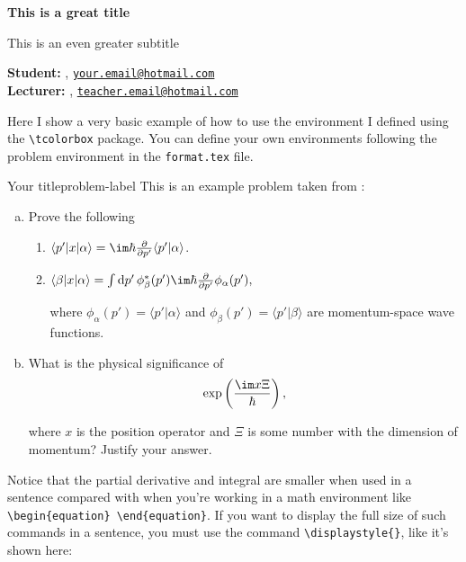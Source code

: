 \documentclass[letterpaper, 11pt]{extarticle}
\begin{document}
\begin{Large}
    \textsf{\textbf{This is a great title}}
    
    This is an even greater subtitle
\end{Large}

\vspace{1ex}

\textsf{\textbf{Student:}} , \href{mailto:your.email@hotmail.com}{\texttt{your.email@hotmail.com}}\\
\textsf{\textbf{Lecturer:}} , \href{mailto:teacher.email@hotmail.com}{\texttt{teacher.email@hotmail.com}}


\vspace{2ex}

Here I show a very basic example of how to use the  environment I defined using the \verb|\tcolorbox| package. You can define your own environments following the problem environment in the \texttt{format.tex} file.

\begin{problem}{Your title}{problem-label}
This is an example problem taken from \cite{Sakurai2020}:

\begin{enumerate}[(a)]
    \item Prove the following
    \begin{enumerate}[label = (\roman*)]
        \item $\langle p' | x | \alpha \rangle = \im \hbar \pdv{}{p'} \langle p' | \alpha \rangle$.

        \item $\langle \beta | x | \alpha \rangle = \int \dd{p'} \phi_{\beta}^{*} (p') \im \hbar \pdv{}{p'} \phi_{\alpha} (p'),$

        where $\phi_{\alpha}(p') = \langle p' | \alpha \rangle$ and $\phi_{\beta}(p') = \langle p' | \beta \rangle$ are momentum-space wave functions.
    \end{enumerate}

    \item What is the physical significance of 
    \[
    \exp\left(\dfrac{\im x \Xi}{\hbar}\right),
    \]

    where $x$ is the position operator and $\Xi$ is some number with the dimension of momentum? Justify your answer.
\end{enumerate}
\end{problem}

Notice that the partial derivative and integral are smaller when used in a sentence compared with when you're working in a math environment like \verb|\begin{equation} \end{equation}|. If you want to display the full size of such commands in a sentence, you must use the command \verb|\displaystyle{}|, like it's shown here:
\end{document}
